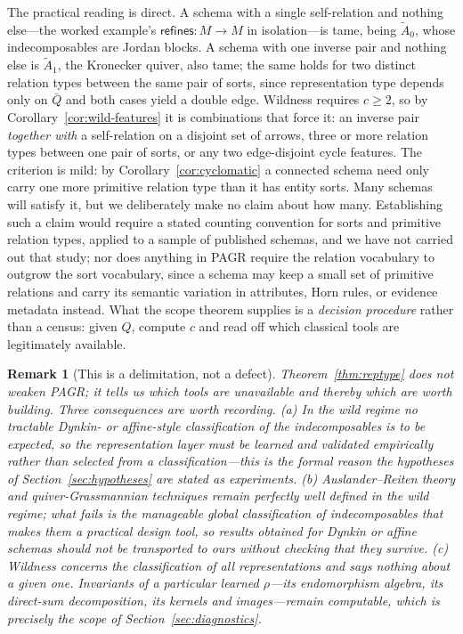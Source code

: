 \documentclass[11pt]{article}
\newtheorem{remark}[definition]{Remark}
\begin{document}
The practical reading is direct. A schema with a single self-relation and nothing else---the worked example's $\mathsf{refines}:M\to M$ in isolation---is tame, being $\tilde A_0$, whose indecomposables are Jordan blocks. A schema with one inverse pair and nothing else is $\tilde A_1$, the Kronecker quiver, also tame; the same holds for two distinct relation types between the same pair of sorts, since representation type depends only on $\bar Q$ and both cases yield a double edge. Wildness requires $c\ge2$, so by Corollary~\ref{cor:wild-features} it is combinations that force it: an inverse pair \emph{together with} a self-relation on a disjoint set of arrows, three or more relation types between one pair of sorts, or any two edge-disjoint cycle features. The criterion is mild: by Corollary~\ref{cor:cyclomatic} a connected schema need only carry one more primitive relation type than it has entity sorts. Many schemas will satisfy it, but we deliberately make no claim about how many. Establishing such a claim would require a stated counting convention for sorts and primitive relation types, applied to a sample of published schemas, and we have not carried out that study; nor does anything in PAGR require the relation vocabulary to outgrow the sort vocabulary, since a schema may keep a small set of primitive relations and carry its semantic variation in attributes, Horn rules, or evidence metadata instead. What the scope theorem supplies is a \emph{decision procedure} rather than a census: given $Q$, compute $c$ and read off which classical tools are legitimately available.

\begin{remark}[This is a delimitation, not a defect]
\label{rem:wild-scope}
Theorem~\ref{thm:reptype} does not weaken PAGR; it tells us which tools are unavailable and thereby which are worth building. Three consequences are worth recording. \emph{(a)} In the wild regime no tractable Dynkin- or affine-style classification of the indecomposables is to be expected, so the representation layer must be learned and validated empirically rather than selected from a classification---this is the formal reason the hypotheses of Section~\ref{sec:hypotheses} are stated as experiments. \emph{(b)} Auslander--Reiten theory and quiver-Grassmannian techniques remain perfectly well defined in the wild regime; what fails is the manageable global classification of indecomposables that makes them a practical design tool, so results obtained for Dynkin or affine schemas should not be transported to ours without checking that they survive. \emph{(c)} Wildness concerns the classification of \emph{all} representations and says nothing about a given one. Invariants of a particular learned $\rho$---its endomorphism algebra, its direct-sum decomposition, its kernels and images---remain computable, which is precisely the scope of Section~\ref{sec:diagnostics}.
\end{remark}
\end{document}
